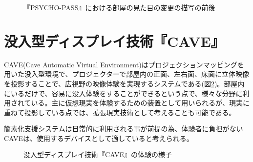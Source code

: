 \begin{figure}[htbp]
  \begin{minipage}{0.5\hsize}
    \begin{center}
    \end{center}
  \end{minipage}
  \begin{minipage}{0.5\hsize}
    \begin{center}
    \end{center}
  \end{minipage}
  \caption{『PSYCHO-PASS』における部屋の見た目の変更の描写の前後}
  \label{fig:psycho}
\end{figure}

\section{没入型ディスプレイ技術『CAVE』}

CAVE(Cave Automatic Virtual Environment)\cite{cave1}はプロジェクションマッピングを用いた没入型環境で、プロジェクターで部屋内の正面、左右面、床面に立体映像を投影することで、広視野の映像体験を実現するシステムである(図\ref{fig:cave})\cite{cave2}。部屋内にいるだけで、容易に没入体験をすることができるという点で、様々な分野に利用されている。主に仮想現実を体験するための装置として用いられるが、現実に重ねて投影している点では、拡張現実技術として考えることも可能である。

簡素化支援システムは日常的に利用される事が前提の為、体験者に負担がないCAVEは、使用するデバイスとして適していると考えられる。

\begin{figure}[htbp]
  \begin{center}
  \end{center}
  \caption{没入型ディスプレイ技術『CAVE』の体験の様子}
  \label{fig:cave}
\end{figure}
